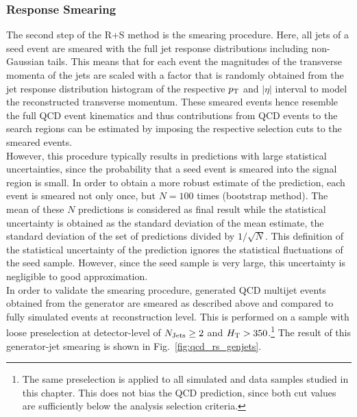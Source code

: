 \subsubsection*{Response Smearing}
\label{subsubsec:qcd_smearing}
The second step of the R+S method is the smearing procedure. Here, all jets of a seed event are smeared with the full jet response distributions including non-Gaussian tails. This means that for each event the magnitudes of the transverse momenta of the jets are scaled with a factor that is randomly obtained from the jet response distribution histogram of the respective $p_{\text{T}}$ and $|\eta|$ interval to model the reconstructed transverse momentum. These smeared events hence resemble the full QCD event kinematics and thus contributions from QCD events to the search regions can be estimated by imposing the respective selection cuts to the smeared events. \\
However, this procedure typically results in predictions with large statistical uncertainties, since the probability that a seed event is smeared into the signal region is small. In order to obtain a more robust estimate of the prediction, each event is smeared not only once, but $N = 100$ times (bootstrap method). The mean of these $N$ predictions is considered as final result while the statistical uncertainty is obtained as the standard deviation of the mean estimate, \ie the standard deviation of the set of predictions divided by $1/\sqrt{N}$. This definition of the statistical uncertainty of the prediction ignores the statistical fluctuations of the seed sample. However, since the seed sample is very large, this uncertainty is negligible to good approximation. \\
In order to validate the smearing procedure, generated QCD multijet events obtained from the \madgraph generator are smeared as described above and compared to fully simulated events at reconstruction level. This is performed on a sample with loose preselection at detector-level of $N_{\text{Jets}} \ge 2$ and $H_{\text{T}} > 350$\gev.\footnote{The same preselection is applied to all simulated and data samples studied in this chapter. This does not bias the QCD prediction, since both cut values are sufficiently below the analysis selection criteria.} The result of this generator-jet smearing is shown in Fig.~\ref{fig:qcd_rs_genjets}. 
